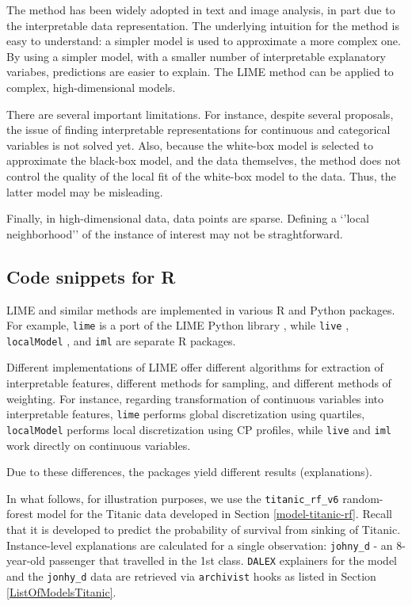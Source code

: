 \documentclass[12pt,]{krantz}
\begin{document}
The method has been widely adopted in text and image analysis, in part due to the interpretable data representation. The underlying intuition for the method is easy to understand: a simpler model is used to approximate a more complex one. By using a simpler model, with a smaller number of interpretable explanatory variabes, predictions are easier to explain. The LIME method can be applied to complex, high-dimensional models.

There are several important limitations. For instance, despite several proposals, the issue of finding interpretable representations for continuous and categorical variables is not solved yet. Also, because the white-box model is selected to approximate the black-box model, and the data themselves, the method does not control the quality of the local fit of the white-box model to the data. Thus, the latter model may be misleading.

Finally, in high-dimensional data, data points are sparse. Defining a `'local neighborhood'' of the instance of interest may not be straghtforward.

\hypertarget{LIMERcode}{%
\subsection{Code snippets for R}\label{LIMERcode}}

LIME and similar methods are implemented in various R and Python packages. For example, \texttt{lime} \citep{R-lime} is a port of the LIME Python library \citep{shapPackage}, while \texttt{live} \citep{R-live}, \texttt{localModel} \citep{localModelPackage}, and \texttt{iml} \citep{imlRPackage} are separate R packages.

Different implementations of LIME offer different algorithms for extraction of interpretable features, different methods for sampling, and different methods of weighting. For instance, regarding transformation of continuous variables into interpretable features, \texttt{lime} performs global discretization using quartiles, \texttt{localModel} performs local discretization using CP profiles, while \texttt{live} and \texttt{iml} work directly on continuous variables.

Due to these differences, the packages yield different results (explanations).

In what follows, for illustration purposes, we use the \texttt{titanic\_rf\_v6} random-forest model for the Titanic data developed in Section \ref{model-titanic-rf}. Recall that it is developed to predict the probability of survival from sinking of Titanic. Instance-level explanations are calculated for a single observation: \texttt{johny\_d} - an 8-year-old passenger that travelled in the 1st class. \texttt{DALEX} explainers for the model and the \texttt{jonhy\_d} data are retrieved via \texttt{archivist} hooks as listed in Section \ref{ListOfModelsTitanic}.
\end{document}
